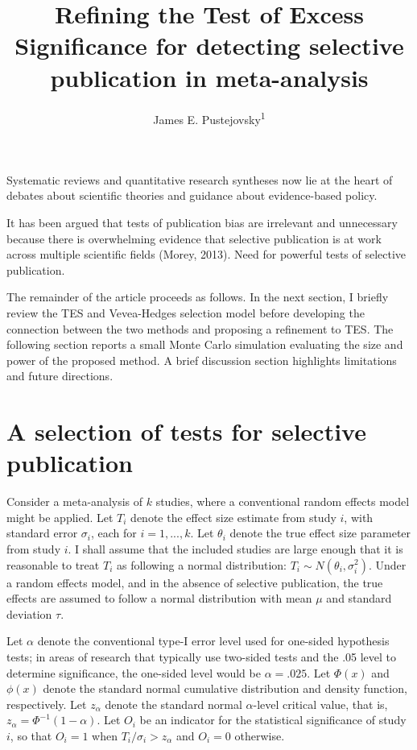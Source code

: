 \documentclass[man,floatsintext]{apa6}
\title{Refining the Test of Excess Significance for detecting selective publication in meta-analysis}
\author{James E. Pustejovsky\textsuperscript{1}}
\date{}
\affiliation{
\vspace{0.5cm}
\textsuperscript{1} University of Texas at Austin}
\begin{document}
\maketitle

Systematic reviews and quantitative research syntheses now lie at the heart of debates about scientific theories and guidance about evidence-based policy.

It has been argued that tests of publication bias are irrelevant and unnecessary because there is overwhelming evidence that selective publication is at work across multiple scientific fields (Morey, 2013).
Need for powerful tests of selective publication.

The remainder of the article proceeds as follows.
In the next section, I briefly review the TES and Vevea-Hedges selection model before developing the connection between the two methods and proposing a refinement to TES.
The following section reports a small Monte Carlo simulation evaluating the size and power of the proposed method.
A brief discussion section highlights limitations and future directions.

\hypertarget{tests}{%
\section{A selection of tests for selective publication}\label{tests}}

Consider a meta-analysis of \(k\) studies, where a conventional random effects model might be applied.
Let \(T_i\) denote the effect size estimate from study \(i\), with standard error \(\sigma_i\), each for \(i = 1,...,k\). Let \(\theta_i\) denote the true effect size parameter from study \(i\).
I shall assume that the included studies are large enough that it is reasonable to treat \(T_i\) as following a normal distribution: \(T_i \sim N(\theta_i, \sigma_i^2)\).
Under a random effects model, and in the absence of selective publication, the true effects are assumed to follow a normal distribution with mean \(\mu\) and standard deviation \(\tau\).

Let \(\alpha\) denote the conventional type-I error level used for one-sided hypothesis tests; in areas of research that typically use two-sided tests and the .05 level to determine significance, the one-sided level would be \(\alpha = .025\).
Let \(\Phi(x)\) and \(\phi(x)\) denote the standard normal cumulative distribution and density function, respectively.
Let \(z_\alpha\) denote the standard normal \(\alpha\)-level critical value, that is, \(z_\alpha = \Phi^{-1}(1 - \alpha)\).
Let \(O_i\) be an indicator for the statistical significance of study \(i\), so that \(O_i = 1\) when \(T_i / \sigma_i > z_\alpha\) and \(O_i = 0\) otherwise.
\end{document}
